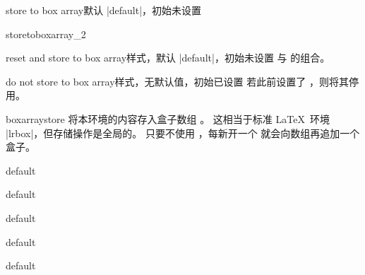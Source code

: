 \begin{docTcbKey}[][doc new=2015-07-13]{store to box array}{}{默认 |default|，初始未设置}
\begin{exdispExample}{storetoboxarray_2}
\begin{tcbitemize}[raster columns=3,raster equal height,
  size=small,halign=center,sharp corners,colback=blue!5]
\tcbitem{}
\tcbitem{}
\tcbitem{}
\tcbitem{}
\tcbitem{}
\tcbitem{}
\end{tcbitemize}
\end{exdispExample}
\end{docTcbKey}


\begin{docTcbKey}[][doc new=2015-07-13]{reset and store to box array}{}{样式，默认 |default|，初始未设置}
   与  的组合。
\end{docTcbKey}



\begin{docTcbKey}[][doc new=2015-07-13]{do not store to box array}{}{样式，无默认值，初始已设置}
若此前设置了 ，则将其停用。
\end{docTcbKey}


\begin{docEnvironment}[doc new=2015-07-13]{boxarraystore}{}
  将本环境的内容存入盒子数组 。
  这相当于标准 \LaTeX\ 环境 |lrbox|，但存储操作是全局的。
  只要不使用 ，每新开一个 
  就会向数组再追加一个盒子。

\begin{dispExample}
\boxarrayreset
\begin{boxarraystore}{default}\end{boxarraystore}
\begin{boxarraystore}{default}\end{boxarraystore}
\begin{boxarraystore}{default}\end{boxarraystore}
\begin{boxarraystore}{default}\end{boxarraystore}
\begin{boxarraystore}{default}\end{boxarraystore}
\hfill
{}
\end{dispExample}
\end{docEnvironment}

